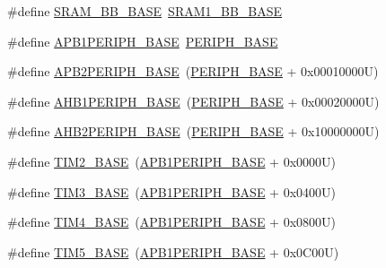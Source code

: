 \begin{DoxyCompactItemize}
\item 
\#define \hyperlink{group___peripheral__memory__map_gad3548b6e2f017f39d399358f3ac98454}{S\+R\+A\+M\+\_\+\+B\+B\+\_\+\+B\+A\+SE}~\hyperlink{group___peripheral__memory__map_gac4c4f61082e4b168f29d9cf97dc3ca5c}{S\+R\+A\+M1\+\_\+\+B\+B\+\_\+\+B\+A\+SE}
\item 
\#define \hyperlink{group___peripheral__memory__map_ga45666d911f39addd4c8c0a0ac3388cfb}{A\+P\+B1\+P\+E\+R\+I\+P\+H\+\_\+\+B\+A\+SE}~\hyperlink{group___peripheral__memory__map_ga9171f49478fa86d932f89e78e73b88b0}{P\+E\+R\+I\+P\+H\+\_\+\+B\+A\+SE}
\item 
\#define \hyperlink{group___peripheral__memory__map_ga25b99d6065f1c8f751e78f43ade652cb}{A\+P\+B2\+P\+E\+R\+I\+P\+H\+\_\+\+B\+A\+SE}~(\hyperlink{group___peripheral__memory__map_ga9171f49478fa86d932f89e78e73b88b0}{P\+E\+R\+I\+P\+H\+\_\+\+B\+A\+SE} + 0x00010000\+U)
\item 
\#define \hyperlink{group___peripheral__memory__map_ga811a9a4ca17f0a50354a9169541d56c4}{A\+H\+B1\+P\+E\+R\+I\+P\+H\+\_\+\+B\+A\+SE}~(\hyperlink{group___peripheral__memory__map_ga9171f49478fa86d932f89e78e73b88b0}{P\+E\+R\+I\+P\+H\+\_\+\+B\+A\+SE} + 0x00020000\+U)
\item 
\#define \hyperlink{group___peripheral__memory__map_gaeedaa71d22a1948492365e2cd26cfd46}{A\+H\+B2\+P\+E\+R\+I\+P\+H\+\_\+\+B\+A\+SE}~(\hyperlink{group___peripheral__memory__map_ga9171f49478fa86d932f89e78e73b88b0}{P\+E\+R\+I\+P\+H\+\_\+\+B\+A\+SE} + 0x10000000\+U)
\item 
\#define \hyperlink{group___peripheral__memory__map_ga00d0fe6ad532ab32f0f81cafca8d3aa5}{T\+I\+M2\+\_\+\+B\+A\+SE}~(\hyperlink{group___peripheral__memory__map_ga45666d911f39addd4c8c0a0ac3388cfb}{A\+P\+B1\+P\+E\+R\+I\+P\+H\+\_\+\+B\+A\+SE} + 0x0000\+U)
\item 
\#define \hyperlink{group___peripheral__memory__map_gaf0c34a518f87e1e505cd2332e989564a}{T\+I\+M3\+\_\+\+B\+A\+SE}~(\hyperlink{group___peripheral__memory__map_ga45666d911f39addd4c8c0a0ac3388cfb}{A\+P\+B1\+P\+E\+R\+I\+P\+H\+\_\+\+B\+A\+SE} + 0x0400\+U)
\item 
\#define \hyperlink{group___peripheral__memory__map_ga56e2d44b0002f316527b8913866a370d}{T\+I\+M4\+\_\+\+B\+A\+SE}~(\hyperlink{group___peripheral__memory__map_ga45666d911f39addd4c8c0a0ac3388cfb}{A\+P\+B1\+P\+E\+R\+I\+P\+H\+\_\+\+B\+A\+SE} + 0x0800\+U)
\item 
\#define \hyperlink{group___peripheral__memory__map_ga3e1671477190d065ba7c944558336d7e}{T\+I\+M5\+\_\+\+B\+A\+SE}~(\hyperlink{group___peripheral__memory__map_ga45666d911f39addd4c8c0a0ac3388cfb}{A\+P\+B1\+P\+E\+R\+I\+P\+H\+\_\+\+B\+A\+SE} + 0x0\+C00\+U)

\end{DoxyCompactItemize}
